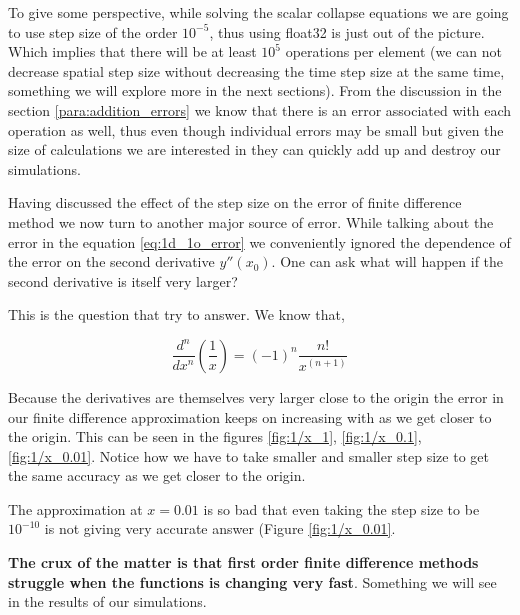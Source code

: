 To give some perspective, while solving the scalar collapse equations we are going to use step size of the order $10^{-5}$, thus using float32 is just out of the picture. Which implies that there will be at least $10^{5}$ operations per element (we can not decrease spatial step size without decreasing the time step size at the same time, something we will explore more in the next sections). From the discussion in the section \ref{para:addition_errors} we know that there is an error associated with each operation as well, thus even though individual errors may be small but given the size of calculations we are interested in they can quickly add up and destroy our simulations.





Having discussed the effect of the step size on the error of finite difference method we now turn to another major source of error. While talking about the error in the equation \ref{eq:1d_1o_error} we conveniently ignored the dependence of the error on the second derivative $y''(x_0)$. One can ask what will happen if the second derivative is itself very larger?

This is the question that  try to answer. We know that,

\begin{equation}
    \frac{d^n}{dx^n}\left(\frac{1}{x}\right) = (-1)^n \frac{n!}{x^(n+1)}
\end{equation}

Because the derivatives are themselves very larger close to the origin the error in our finite difference approximation keeps on increasing with as we get closer to the origin. This can be seen in the figures \ref{fig:1/x_1}, \ref{fig:1/x_0.1}, \ref{fig:1/x_0.01}. Notice how we have to take smaller and smaller step size to get the same accuracy as we get closer to the origin.

The approximation at $x=0.01$ is so bad that even taking the step size to be $10^{-10}$ is not giving very accurate answer (Figure \ref{fig:1/x_0.01}.

\textbf{The crux of the matter is that first order finite difference methods struggle when the functions is changing very fast}. Something we will see in the results of our simulations.


